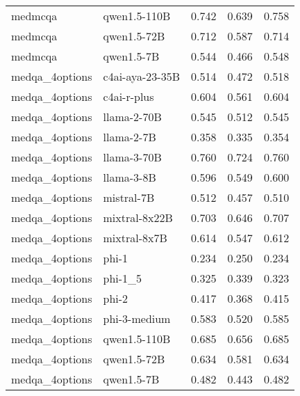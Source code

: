 \begin{tabular}{llrrr}
medmcqa & qwen1.5-110B & 0.742 & 0.639 & 0.758 \\
medmcqa & qwen1.5-72B & 0.712 & 0.587 & 0.714 \\
medmcqa & qwen1.5-7B & 0.544 & 0.466 & 0.548 \\
medqa_4options & c4ai-aya-23-35B & 0.514 & 0.472 & 0.518 \\
medqa_4options & c4ai-r-plus & 0.604 & 0.561 & 0.604 \\
medqa_4options & llama-2-70B & 0.545 & 0.512 & 0.545 \\
medqa_4options & llama-2-7B & 0.358 & 0.335 & 0.354 \\
medqa_4options & llama-3-70B & 0.760 & 0.724 & 0.760 \\
medqa_4options & llama-3-8B & 0.596 & 0.549 & 0.600 \\
medqa_4options & mistral-7B & 0.512 & 0.457 & 0.510 \\
medqa_4options & mixtral-8x22B & 0.703 & 0.646 & 0.707 \\
medqa_4options & mixtral-8x7B & 0.614 & 0.547 & 0.612 \\
medqa_4options & phi-1 & 0.234 & 0.250 & 0.234 \\
medqa_4options & phi-1_5 & 0.325 & 0.339 & 0.323 \\
medqa_4options & phi-2 & 0.417 & 0.368 & 0.415 \\
medqa_4options & phi-3-medium & 0.583 & 0.520 & 0.585 \\
medqa_4options & qwen1.5-110B & 0.685 & 0.656 & 0.685 \\
medqa_4options & qwen1.5-72B & 0.634 & 0.581 & 0.634 \\
medqa_4options & qwen1.5-7B & 0.482 & 0.443 & 0.482 \\
\bottomrule
\end{tabular}
